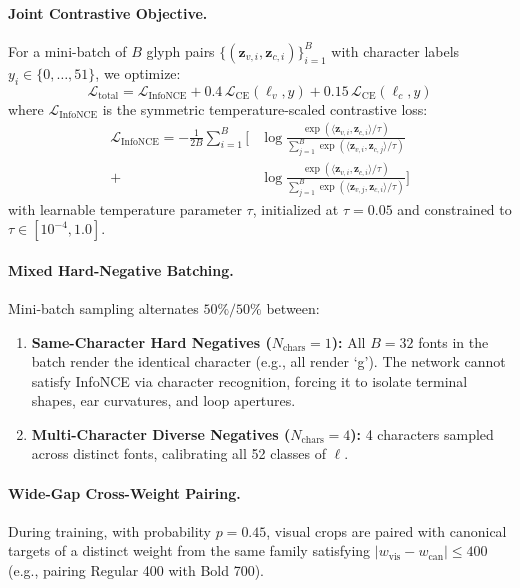 \documentclass[10pt,twocolumn,letterpaper]{article}
\begin{document}
\paragraph{Joint Contrastive Objective.}
For a mini-batch of $B$ glyph pairs $\{(\mathbf{z}_{v, i}, \mathbf{z}_{c, i})\}_{i=1}^B$ with character labels $y_i \in \{0, \dots, 51\}$, we optimize:
\begin{equation}
    \mathcal{L}_{\text{total}} = \mathcal{L}_{\text{InfoNCE}} + 0.4\,\mathcal{L}_{\text{CE}}(\boldsymbol{\ell}_v, y) + 0.15\,\mathcal{L}_{\text{CE}}(\boldsymbol{\ell}_c, y)
\end{equation}
where $\mathcal{L}_{\text{InfoNCE}}$ is the symmetric temperature-scaled contrastive loss:
\begin{equation}
\begin{split}
    \mathcal{L}_{\text{InfoNCE}} = -\frac{1}{2B} \sum_{i=1}^B \Bigg[ &\log \frac{\exp(\langle \mathbf{z}_{v, i}, \mathbf{z}_{c, i} \rangle / \tau)}{\sum_{j=1}^B \exp(\langle \mathbf{z}_{v, i}, \mathbf{z}_{c, j} \rangle / \tau)} \\
    + &\log \frac{\exp(\langle \mathbf{z}_{v, i}, \mathbf{z}_{c, i} \rangle / \tau)}{\sum_{j=1}^B \exp(\langle \mathbf{z}_{v, j}, \mathbf{z}_{c, i} \rangle / \tau)} \Bigg]
\end{split}
\end{equation}
with learnable temperature parameter $\tau$, initialized at $\tau = 0.05$ and constrained to $\tau \in [10^{-4}, 1.0]$.

\paragraph{Mixed Hard-Negative Batching.}
Mini-batch sampling alternates $50\% / 50\%$ between:
\begin{enumerate}
    \item \textbf{Same-Character Hard Negatives ($N_{\text{chars}}=1$):} All $B=32$ fonts in the batch render the identical character (e.g., all render `g'). The network cannot satisfy InfoNCE via character recognition, forcing it to isolate terminal shapes, ear curvatures, and loop apertures.
    \item \textbf{Multi-Character Diverse Negatives ($N_{\text{chars}}=4$):} 4 characters sampled across distinct fonts, calibrating all 52 classes of $\boldsymbol{\ell}$.
\end{enumerate}

\paragraph{Wide-Gap Cross-Weight Pairing.}
During training, with probability $p=0.45$, visual crops are paired with canonical targets of a distinct weight from the same family satisfying $|w_{\text{vis}} - w_{\text{can}}| \le 400$ (e.g., pairing Regular 400 with Bold 700).
\end{document}
